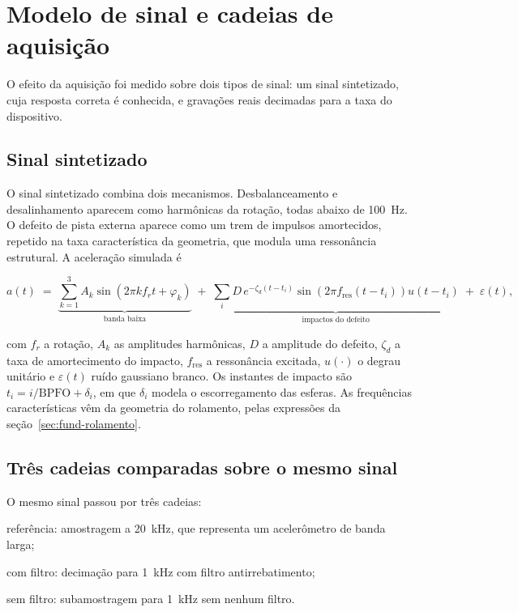\section{Modelo de sinal e cadeias de aquisição}
\label{sec:dev-sinal}

O efeito da aquisição foi medido sobre dois tipos de sinal: um sinal sintetizado, cuja
resposta correta é conhecida, e gravações reais decimadas para a taxa do dispositivo.

\subsection{Sinal sintetizado}

O sinal sintetizado combina dois mecanismos. Desbalanceamento e desalinhamento aparecem como
harmônicas da rotação, todas abaixo de \SI{100}{\hertz}. O defeito de pista externa aparece
como um trem de impulsos amortecidos, repetido na taxa característica da geometria, que
modula uma ressonância estrutural. A aceleração simulada é

\begin{equation}
a(t) \;=\; \underbrace{\sum_{k=1}^{3} A_k \sin\!\left(2\pi k f_r t + \varphi_k\right)}_{\text{banda baixa}}
\;+\; \underbrace{\sum_{i} D\, e^{-\zeta_d (t-t_i)} \sin\!\left(2\pi f_{\mathrm{res}} (t-t_i)\right) u(t-t_i)}_{\text{impactos do defeito}}
\;+\; \varepsilon(t),
\label{eq:dev-sinal}
\end{equation}

\noindent
com $f_r$ a rotação, $A_k$ as amplitudes harmônicas, $D$ a amplitude do defeito, $\zeta_d$
a taxa de amortecimento do impacto, $f_{\mathrm{res}}$ a ressonância excitada,
$u(\cdot)$ o degrau unitário e $\varepsilon(t)$ ruído gaussiano branco. Os instantes de
impacto são $t_i = i/\mathrm{BPFO} + \delta_i$, em que $\delta_i$ modela o escorregamento
das esferas. As frequências características vêm da geometria do rolamento, pelas expressões
da seção~\ref{sec:fund-rolamento}.

\subsection{Três cadeias comparadas sobre o mesmo sinal}

O mesmo sinal passou por três cadeias:

\begin{alineas}
  \item referência: amostragem a \SI{20}{\kilo\hertz}, que representa um acelerômetro de
        banda larga;
  \item com filtro: decimação para \SI{1}{\kilo\hertz} com filtro antirrebatimento;
  \item sem filtro: subamostragem para \SI{1}{\kilo\hertz} sem nenhum filtro.
\end{alineas}

